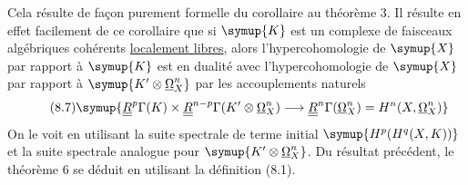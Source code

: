 Cela résulte de façon purement formelle du corollaire au théorème 3. Il résulte
en effet facilement de ce corollaire que si $\symup{K}$ est un complexe de faisceaux
algébriques cohérents \uline{localement libres}, alors l'hypercohomologie de $\symup{X}$ par
rapport à $\symup{K}$ est en dualité avec l'hypercohomologie de $\symup{X}$ par rapport à
$\symup{K'\otimes\underline{\Omega}_X^{n}}$ par les accouplements naturels
\begin{equation}\tag{8.7}
  \symup{\underline{\underline{R}}^{p}\Gamma(K)
  \times\underline{\underline{R}}^{n-p}\Gamma(K'\otimes\underline{\Omega}_X^{n})
  \longrightarrow\underline{\underline{R}}^{n}\Gamma(\underline{\Omega}_X^{n})
  =H^{n}(X,\underline{\Omega}_X^{n})}
\end{equation}
On le voit en utilisant la suite spectrale de terme initial
$\symup{H^{p}(H^{q}(X,K))}$ et la suite spectrale analogue pour
$\symup{K'\otimes\underline{\Omega}_X^{n}}$. Du résultat précédent, le théorème 6 se déduit en
utilisant la définition (8.1).

